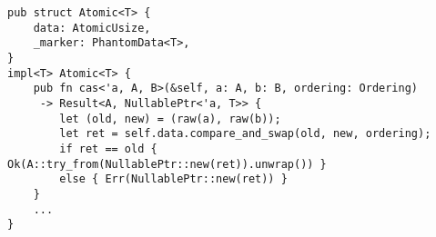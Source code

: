 \begin{lstlisting}[caption=Excerpt of \mc{Atomic}s definitions (Trait bounds omitted for brevity)]
pub struct Atomic<T> {
    data: AtomicUsize,
    _marker: PhantomData<T>,
}
impl<T> Atomic<T> {
    pub fn cas<'a, A, B>(&self, a: A, b: B, ordering: Ordering)
     -> Result<A, NullablePtr<'a, T>> {
        let (old, new) = (raw(a), raw(b));
        let ret = self.data.compare_and_swap(old, new, ordering);
        if ret == old { Ok(A::try_from(NullablePtr::new(ret)).unwrap()) }
        else { Err(NullablePtr::new(ret)) }
    }
    ...
}

\end{lstlisting}

